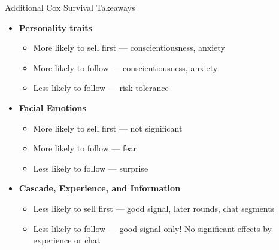 \documentclass{beamer}
\begin{document}
\begin{frame}{Additional Cox Survival Takeaways}
\begin{itemize}
    \item \textbf{Personality traits} 
    \begin{itemize}
        \item More likely to sell first  --- conscientiousness, anxiety
        \item More likely to follow   --- conscientiousness, anxiety
        \item Less likely to follow    --- risk tolerance
    \end{itemize}
\vspace{0.2in}
    \item \textbf{Facial Emotions}
    \begin{itemize}
        \item More likely to sell first  --- not significant
        \item More likely to follow   --- fear
        \item Less likely to follow   --- surprise
    \end{itemize}
\vspace{0.2in}
    \item \textbf{Cascade, Experience, and Information} 
        \begin{itemize}
        \item Less likely to sell first  --- good signal, later rounds, chat segments
        \item Less likely to follow  --- good signal only! No significant effects by experience or chat
    \end{itemize}
\end{itemize}
\end{frame}
\end{document}
